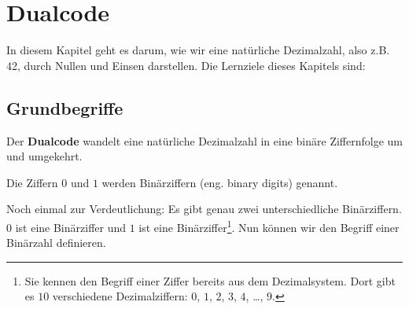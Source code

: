 
\toggletrue{image}
\toggletrue{imagehover}

\chapter{Dualcode}
\label{ch:dualcode}

In diesem Kapitel geht es darum, wie wir eine natürliche Dezimalzahl, also z.B. \num{42}, durch Nullen und Einsen darstellen. Die Lernziele dieses Kapitels sind:\\


\section{Grundbegriffe}

Der \textbf{Dualcode} wandelt eine natürliche Dezimalzahl in eine binäre Ziffernfolge um und umgekehrt.

\begin{definition}[Binärziffer]
Die Ziffern $0$ und $1$ werden Binärziffern (eng. binary digits) genannt.
\end{definition}

Noch einmal zur Verdeutlichung: Es gibt genau zwei unterschiedliche Binärziffern. $0$ ist eine Binärziffer und $1$ ist eine Binärziffer\footnote{Sie kennen den Begriff einer Ziffer bereits aus dem Dezimalsystem. Dort gibt es $10$ verschiedene Dezimalziffern: $0$, $1$, $2$, $3$, $4$, \dots, $9$.}. Nun können wir den Begriff einer Binärzahl definieren.


